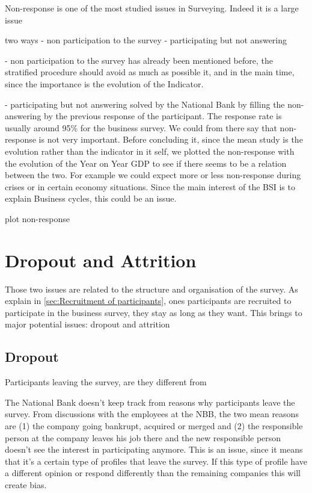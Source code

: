 \documentclass[12pt,a4paper,oneside]{book}
\begin{document}
Non-response is one of the most studied issues in Surveying. Indeed it is a large issue

two ways 
- non participation to the survey
- participating but not answering 

- non participation to the survey
has already been mentioned before, the stratified procedure should avoid as much as possible it, and in the main time, since the importance is the evolution of the Indicator.

- participating but not answering 
 solved by the National Bank by filling the non-answering by the previous response of the participant. 
The response rate is usually around 95\% for the business survey. We could from there say that non-response is not very important. 
Before concluding it, since the mean study is the evolution rather than the indicator in it self, we plotted the non-response with the evolution of the Year on Year GDP to see if there seems to be a relation between the two. For example we could expect more or less non-response during crises or in certain economy situations. Since the main interest of the BSI is to explain Business cycles,
this could be an issue.

plot non-response



\section{Dropout and Attrition}

Those two issues are related to the structure and organisation of the survey. As explain in \autoref{sec:Recruitment of participants}, ones participants are recruited to participate in the business survey, they stay as long as they want. This brings to major potential issues: dropout and attrition

\subsection{Dropout}

Participants leaving the survey, are they different from 

The National Bank doesn't keep track from reasons why participants leave the survey. From discussions with the employees at the NBB, the two mean reasons are (1) the company going bankrupt, acquired or merged and (2) the responsible person at the company leaves his job there and the new responsible person doesn't see the interest in participating anymore.
This is an issue, since it means that it's a certain type of profiles that leave the survey. If this type of profile have a different opinion or respond differently than the remaining companies this will create bias. 
\end{document}

